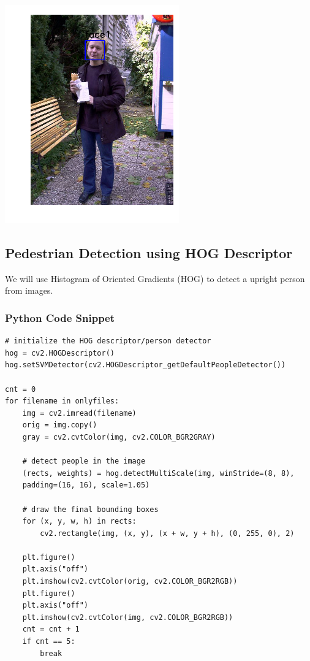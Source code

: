 \includegraphics{facedetection_files/facedetection_59_10.png}

\subsection{Pedestrian Detection using HOG
Descriptor}\label{pedestrian-detection-using-hog-descriptor}

We will use Histogram of Oriented Gradients (HOG) to detect a upright
person from images.

\subsubsection{Python Code Snippet}\label{python-code-snippet}

\begin{verbatim}
# initialize the HOG descriptor/person detector
hog = cv2.HOGDescriptor()
hog.setSVMDetector(cv2.HOGDescriptor_getDefaultPeopleDetector())

cnt = 0
for filename in onlyfiles:
    img = cv2.imread(filename)
    orig = img.copy()
    gray = cv2.cvtColor(img, cv2.COLOR_BGR2GRAY)

    # detect people in the image
    (rects, weights) = hog.detectMultiScale(img, winStride=(8, 8),
    padding=(16, 16), scale=1.05)

    # draw the final bounding boxes
    for (x, y, w, h) in rects:
        cv2.rectangle(img, (x, y), (x + w, y + h), (0, 255, 0), 2)

    plt.figure()
    plt.axis("off")
    plt.imshow(cv2.cvtColor(orig, cv2.COLOR_BGR2RGB))
    plt.figure()
    plt.axis("off")
    plt.imshow(cv2.cvtColor(img, cv2.COLOR_BGR2RGB))
    cnt = cnt + 1
    if cnt == 5:
        break
\end{verbatim}

